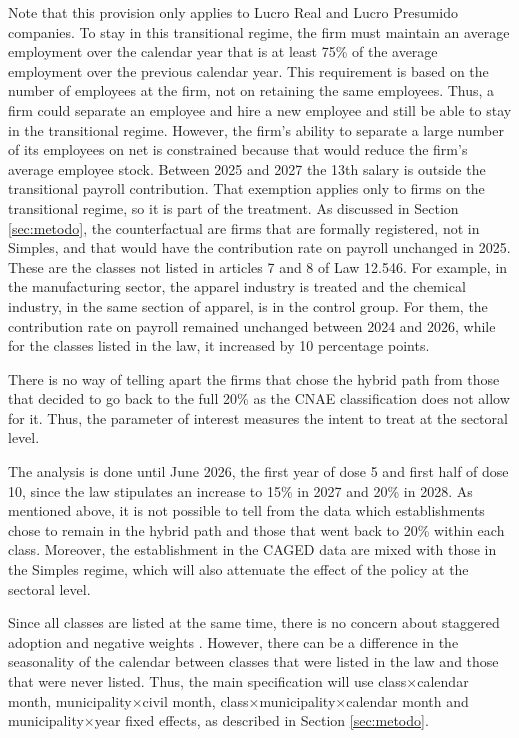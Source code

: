 \documentclass[12pt,a4paper]{article}
\begin{document}
Note that this provision only applies to Lucro Real and Lucro Presumido companies. To stay in this transitional regime, the firm must maintain an average employment over the calendar year that is at least 75\% of the average employment over the previous calendar year. This requirement is based on the number of employees at the firm, not on retaining the same employees. Thus, a firm could separate an employee and hire a new employee and still be able to stay in the transitional regime. However, the firm’s ability to separate a large number of its employees on net is constrained because that would reduce the firm’s average employee stock. Between 2025 and 2027 the 13th salary is outside the transitional payroll contribution. That exemption applies only to firms on the transitional regime, so it is part of the treatment.
As discussed in Section \ref{sec:metodo}, the counterfactual are firms that are formally registered, not in Simples, and that would have the contribution rate on payroll unchanged in 2025. These are the classes not listed in articles 7 and 8 of Law 12.546. For example, in the manufacturing sector, the apparel industry is treated and the chemical industry, in the same section of apparel, is in the control group. For them, the contribution rate on payroll remained unchanged between 2024 and 2026, while for the classes listed in the law, it increased by 10 percentage points.

There is no way of telling apart the firms that chose the hybrid path from those that decided to go back to the full 20\% as the CNAE classification does not allow for it. Thus, the parameter of interest measures the intent to treat at the sectoral level.

The analysis is done until June 2026, the first year of dose 5 and first half of dose 10, since the law stipulates an increase to 15\% in 2027 and 20\% in 2028. As mentioned above, it is not possible to tell from the data which establishments chose to remain in the hybrid path and those that went back to 20\% within each class. Moreover, the establishment in the CAGED data are mixed with those in the Simples regime, which will also attenuate the effect of the policy at the sectoral level.

Since all classes are listed at the same time, there is no concern about staggered adoption and negative weights \citep{goodman2021using, de2022using}. However, there can be a difference in the seasonality of the calendar between classes that were listed in the law and those that were never listed. Thus, the main specification will use class$\times$calendar month, municipality$\times$civil month, class$\times$municipality$\times$calendar month and municipality$\times$year fixed effects, as described in Section \ref{sec:metodo}.
\end{document}
